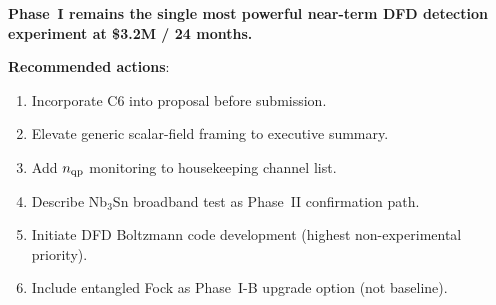 \documentclass[11pt]{article}
\theoremstyle{definition}
\theoremstyle{remark}
\begin{document}
\begin{tcolorbox}[colback=green!5!white, colframe=green!50!black,
  title=\textbf{W4i14 P11 BOTTOM LINE}]
\textbf{Phase~I remains the single most powerful near-term DFD
detection experiment at \$3.2M / 24 months.}

\textbf{Recommended actions}:
\begin{enumerate}[nosep]
\item Incorporate C6 into proposal before submission.
\item Elevate generic scalar-field framing to executive summary.
\item Add $n_{\rm qp}$ monitoring to housekeeping channel list.
\item Describe Nb$_3$Sn broadband test as Phase~II confirmation path.
\item Initiate DFD Boltzmann code development (highest non-experimental
  priority).
\item Include entangled Fock as Phase~I-B upgrade option (not baseline).
\end{enumerate}

\end{tcolorbox}
\end{document}
